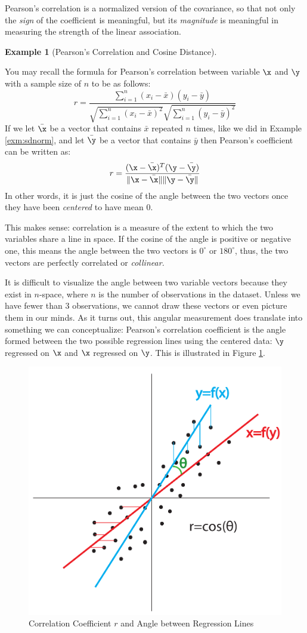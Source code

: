 \documentclass[
]{article}
\theoremstyle{definition}
\theoremstyle{definition}
\newtheorem{example}{Example}[section]
\theoremstyle{definition}
\theoremstyle{definition}
\theoremstyle{remark}
\begin{document}
Pearson's correlation is a normalized version of the covariance, so that not only the \emph{sign} of the coefficient is meaningful, but its \emph{magnitude} is meaningful in measuring the strength of the linear association.



\begin{example}[Pearson's Correlation and Cosine Distance]
\protect\hypertarget{exm:cosinecorr}{}\label{exm:cosinecorr}

You may recall the formula for Pearson's correlation between variable \(\x\) and \(\y\) with a sample size of \(n\) to be as follows:
\[r = \frac{\sum_{i=1}^{n} (x_i - \bar{x})(y_i-\bar{y})}{\sqrt{\sum_{i=1}^{n} (x_i - \bar{x})^2}\sqrt{\sum_{i=1}^{n} (y_i - \bar{y})^2}}\]
If we let \(\bar{\x}\) be a vector that contains \(\bar{x}\) repeated \(n\) times, like we did in Example \ref{exm:sdnorm}, and let \(\bar{\y}\) be a vector that contains \(\bar{y}\) then Pearson's coefficient can be written as:
\[r=\frac{(\x-\bar{\x})^T(\y-\bar{\y})}{\|\x-\bar{\x}\|\|\y-\bar{\y}\|}\]
In other words, it is just the cosine of the angle between the two vectors once they have been \emph{centered} to have mean 0.

This makes sense: correlation is a measure of the extent to which the two variables share a line in space. If the cosine of the angle is positive or negative one, this means the angle between the two vectors is \(0^{\circ}\) or \(180^{\circ}\), thus, the two vectors are perfectly correlated or \emph{collinear.}

\end{example}

It is difficult to visualize the angle between two variable vectors because they exist in \(n\)-space, where \(n\) is the number of observations in the dataset. Unless we have fewer than 3 observations, we cannot draw these vectors or even picture them in our minds. As it turns out, this angular measurement does translate into something we can conceptualize: Pearson's correlation coefficient is the angle formed between the two possible regression lines using the centered data: \(\y\) regressed on \(\x\) and \(\x\) regressed on \(\y\). This is illustrated in Figure \ref{fig:corrangle}.



\begin{figure}

{\centering \includegraphics[width=0.4\linewidth]{figs/corrangle} 

}

\caption{Correlation Coefficient \(r\) and Angle between Regression Lines}\label{fig:corrangle}
\end{figure}
\end{document}
